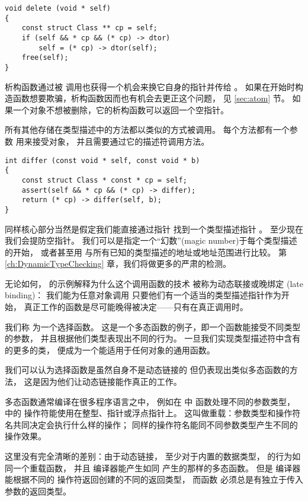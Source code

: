 \begin{lstlisting}
void delete (void * self)
{   
    const struct Class ** cp = self;
    if (self && * cp && (* cp) -> dtor)
        self = (* cp) -> dtor(self);
    free(self);
}
\end{lstlisting}

析构函数通过被
 调用也获得一个机会来换它自身的指针并传给
。
如果在开始时构造函数想要欺骗，析构函数因而也有机会去更正这个问题，
见 \ref{sec:atom} 节。
如果一个对象不想被删除，它的析构函数可以返回一个空指针。

所有其他存储在类型描述中的方法都以类似的方式被调用。
每个方法都有一个参数  用来接受对象，
并且需要通过它的描述符调用方法。
\begin{lstlisting}
int differ (const void * self, const void * b)
{
    const struct Class * const * cp = self;
    assert(self && * cp && (* cp) -> differ);
    return (* cp) -> differ(self, b);
}
\end{lstlisting}

同样核心部分当然是假定我们能直接通过指针 
找到一个类型描述指针 。
至少现在我们会提防空指针。
我们可以是指定一个“幻数”(magic number)于每个类型描述的开始，
或者甚至用  与所有已知的类型描述的地址或地址范围进行比较。
第 \ref{ch:DynamicTypeChecking} 章，我们将做更多的严肃的检测。

无论如何， 的示例解释为什么这个调用函数的技术
被称为动态联接或晚绑定 (late binding)：
我们能为任意对象调用 
只要他们有一个适当的类型描述指针作为开始，
真正工作的函数是尽可能晚得被决定——只有在真正调用时。

我们称  为一个选择函数。
这是一个多态函数的例子，即一个函数能接受不同类型的参数，
并且根据他们类型表现出不同的行为。
一旦我们实现类型描述符中含有  的更多的类，
 便成为一个能适用于任何对象的通用函数。

我们可以认为选择函数是虽然自身不是动态链接的
但仍表现出类似多态函数的方法，
这是因为他们让动态链接能作真正的工作。

多态函数通常编译在很多程序语言之中，
例如在  中  函数处理不同的参数类型，
 中的 \ccode{+} 操作符能使用在整型、指针或浮点指针上。
这叫做重载：参数类型和操作符名共同决定会执行什么样的操作；
同样的操作符名能同不同参数类型产生不同的操作效果。

这里没有完全清晰的差别：由于动态链接，
至少对于内置的数据类型， 的行为如同一个重载函数，
并且  编译器能产生如同 \ccode{+} 产生的那样的多态函数。
但是  编译器能根据不同的
\ccode{+} 操作符返回创建的不同的返回类型，
而函数  必须总是有独立于传入参数的返回类型。

